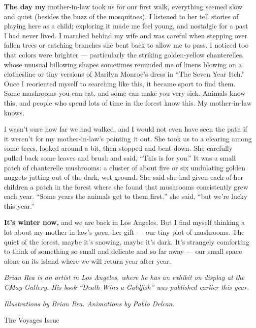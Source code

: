 \textbf{The day my} mother-in-law took us for our first walk, everything
seemed slow and quiet (besides the buzz of the mosquitoes). I listened
to her tell stories of playing here as a child; exploring it made me
feel young, and nostalgic for a past I had never lived. I marched behind
my wife and was careful when stepping over fallen trees or catching
branches she bent back to allow me to pass. I noticed too that colors
were brighter --- particularly the striking golden-yellow chanterelles,
whose unusual billowing shapes sometimes reminded me of linens blowing
on a clothesline or tiny versions of Marilyn Monroe's dress in ``The
Seven Year Itch.'' Once I reoriented myself to searching like this, it
became sport to find them. Some mushrooms you can eat, and some can make
you very sick. Animals know this, and people who spend lots of time in
the forest know this. My mother-in-law knows.

I wasn't sure how far we had walked, and I would not even have seen the
path if it weren't for my mother-in-law's pointing it out. She took us
to a clearing among some trees, looked around a bit, then stopped and
bent down. She carefully pulled back some leaves and brush and said,
``This is for you.'' It was a small patch of chanterelle mushrooms: a
cluster of about five or six undulating golden nuggets jutting out of
the dark, wet ground. She said she had given each of her children a
patch in the forest where she found that mushrooms consistently grew
each year. ``Some years the animals get to them first,'' she said, ``but
we're lucky this year.''

\textbf{It's winter now,} and we are back in Los Angeles. But I find
myself thinking a lot about my mother-in-law's \emph{gava,} her gift ---
our tiny plot of mushrooms. The quiet of the forest, maybe it's snowing,
maybe it's dark. It's strangely comforting to think of something so
small and delicate and so far away --- our small space alone on its
island where we will return year after year.

\emph{Brian Rea is an artist in Los Angeles, where he has an exhibit on
display at the CMay Gallery. His book ``Death Wins a Goldfish'' was
published earlier this year.}

\emph{Illustrations by Brian Rea. Animations by Pablo Delcan.}

The Voyages Issue

\hypertarget{-7}{%
\section{}\label{-7}}

